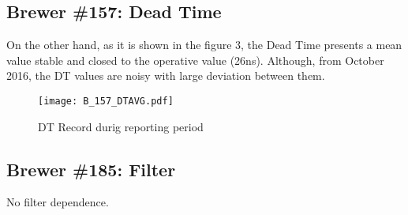 \documentclass[../main.tex]{subfiles}
\begin{document}
\subsection{Brewer \#157: Dead Time} 
On the other hand, as it is shown in the figure 3, the Dead Time presents a mean value stable and closed to the operative value (26ns). Although, from October 2016, the DT values are noisy with large deviation between them.


\begin{figure}[bh]

\texttt{[image: B\_157\_DTAVG.pdf]}
\label{fig:DT_comp}
\caption{DT Record durig reporting period}
\end{figure}
 
 
\subsection{Brewer \#185: Filter} 

No filter dependence.
 \begin{table}[h]
        {}
       {}
\end{table}
\end{document}
